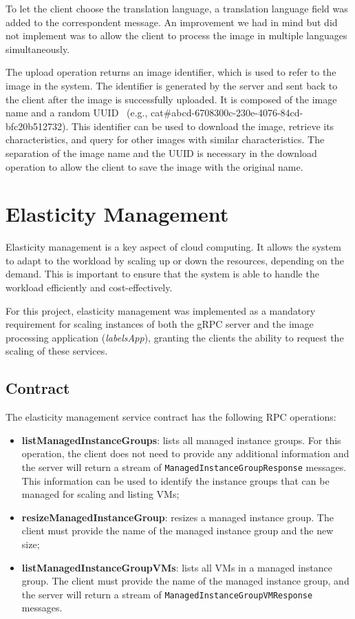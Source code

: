 To let the client choose the translation language, a translation language field was added to the correspondent message.
An improvement we had in mind but did not implement was to allow the client to process the image in multiple languages simultaneously.

The upload operation returns an image identifier, which is used to refer to the image in the system.
The identifier is generated by the server and sent back to the client after the image is successfully uploaded.
It is composed of the image name and a random UUID~\cite{oracle-uuid} (e.g., cat\#abcd-6708300c-230e-4076-84cd-bfc20b512732).
This identifier can be used to download the image, retrieve its characteristics,
and query for other images with similar characteristics.
The separation of the image name and the UUID is necessary in the download operation to allow the client to save the image with the original name.


\section{Elasticity Management}\label{sec:elasticity_management}

Elasticity management is a key aspect of cloud computing.
It allows the system to adapt to the workload by scaling up or down the resources, depending on the demand.
This is important to ensure that the system is able to handle the workload efficiently and cost-effectively.

For this project,
elasticity management was implemented as a mandatory requirement for scaling instances of both the gRPC server and the image processing application
(\textit{labelsApp}), granting the clients the ability to request the scaling of these services.

\subsection{Contract}\label{subsec:elasticity-management-contract}

The elasticity management service contract has the following RPC operations:

\begin{itemize}
    \item \textbf{listManagedInstanceGroups}: lists all managed instance groups.
    For this operation,
    the client does not need to provide any additional information
    and the server will return a stream of \texttt{ManagedInstanceGroupResponse} messages.
    This information can be used to identify the instance groups that can be managed for scaling and listing VMs;
    \item \textbf{resizeManagedInstanceGroup}: resizes a managed instance group.
    The client must provide the name of the managed instance group and the new size;
    \item \textbf{listManagedInstanceGroupVMs}: lists all VMs in a managed instance group.
    The client must provide the name of the managed instance group, and the server will return a stream of \texttt{ManagedInstanceGroupVMResponse} messages.
\end{itemize}

